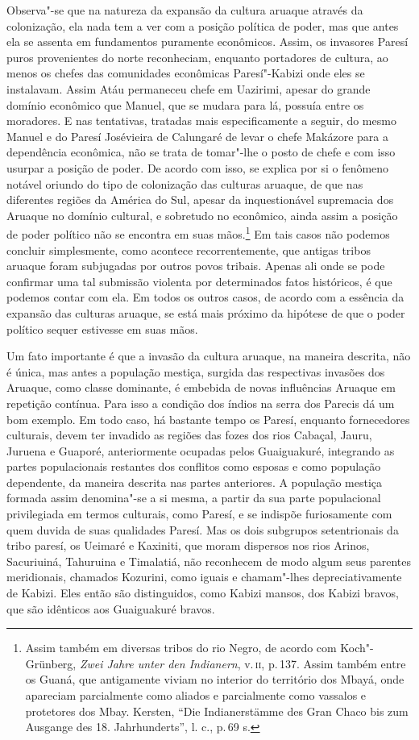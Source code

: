 Observa"-se que na natureza da expansão da cultura aruaque através da
colonização, ela nada tem a ver com a posição política de poder, mas que
antes ela se assenta em fundamentos puramente econômicos. Assim, os
invasores Paresí puros provenientes do norte reconheciam, enquanto
portadores de cultura, ao menos os chefes das comunidades econômicas
Paresí"-Kabizi onde eles se instalavam. Assim Atáu permaneceu chefe em
Uazirimi, apesar do grande domínio econômico que Manuel, que se mudara
para lá, possuía entre os moradores. E nas tentativas, tratadas mais
especificamente a seguir, do mesmo Manuel e do Paresí Josévieira de
Calungaré de levar o chefe Makázore para a dependência econômica, não se
trata de tomar"-lhe o posto de chefe e com isso usurpar a posição de
poder. De acordo com isso, se explica por si o fenômeno notável oriundo
do tipo de colonização das culturas aruaque, de que nas diferentes
regiões da América do Sul, apesar da inquestionável supremacia dos
Aruaque no domínio cultural, e sobretudo no econômico, ainda assim a
posição de poder político não se encontra em suas mãos.\footnote{Assim
  também em diversas tribos do rio Negro, de acordo com Koch"-Grünberg,
  \textit{Zwei Jahre unter den Indianern}, v.\,\textsc{ii}, p.\,137. Assim também
  entre os Guaná, que antigamente viviam no interior do território dos
  Mbayá, onde apareciam parcialmente como aliados e parcialmente como
  vassalos e protetores dos Mbay. Kersten, ``Die Indianerstämme des Gran
  Chaco bis zum Ausgange des 18. Jahrhunderts'', l. c., p.\,69 s.} Em
tais casos não podemos concluir simplesmente, como acontece
recorrentemente, que antigas tribos aruaque foram subjugadas por outros
povos tribais. Apenas ali onde se pode confirmar uma tal submissão
violenta por determinados fatos históricos, é que podemos contar com
ela. Em todos os outros casos, de acordo com a essência da expansão das
culturas aruaque, se está mais próximo da hipótese de que o poder
político sequer estivesse em suas mãos.

Um fato importante é que a invasão da cultura aruaque, na maneira
descrita, não é única, mas antes a população mestiça, surgida das
respectivas invasões dos Aruaque, como classe dominante, é embebida de
novas influências Aruaque em repetição contínua. Para isso a condição
dos índios na serra dos Parecis dá um bom exemplo. Em todo caso, há
bastante tempo os Paresí, enquanto fornecedores culturais, devem ter
invadido as regiões das fozes dos rios Cabaçal, Jauru, Juruena e
Guaporé, anteriormente ocupadas pelos Guaiguakuré, integrando as partes
populacionais restantes dos conflitos como esposas e como população
dependente, da maneira descrita nas partes anteriores. A população
mestiça formada assim denomina"-se a si mesma, a partir da sua parte
populacional privilegiada em termos culturais, como Paresí, e se
indispõe furiosamente com quem duvida de suas qualidades Paresí. Mas os
dois subgrupos setentrionais da tribo paresí, os Ueimaré e Kaxiniti, que
moram dispersos nos rios Arinos, Sacuriuiná, Tahuruina e Timalatiá, não
reconhecem de modo algum seus parentes meridionais, chamados Kozurini,
como iguais e chamam"-lhes depreciativamente de Kabizi. Eles então são
distinguidos, como Kabizi mansos, dos Kabizi bravos, que são idênticos
aos Guaiguakuré bravos.

